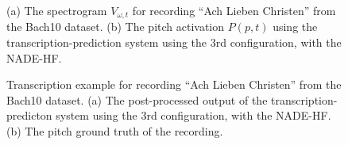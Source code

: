 \begin{figure}[t]
 \vspace{-0.05in}
 \caption{(a) The spectrogram $V_{\omega,t}$ for recording ``Ach Lieben Christen'' from the Bach10 dataset. (b) The pitch activation $P(p,t)$ using the  transcription-prediction system using the 3rd configuration, with the NADE-HF.}
 \label{fig:Spectrogram}
\end{figure}

\begin{figure}[t]
  \vspace{-0.05in}
 \caption{Transcription example for recording ``Ach Lieben Christen'' from the Bach10 dataset. (a) The post-processed output of the transcription-predicton system using the 3rd configuration, with the NADE-HF. (b) The pitch ground truth of the recording.}
 \label{fig:Transcription}
\end{figure}

